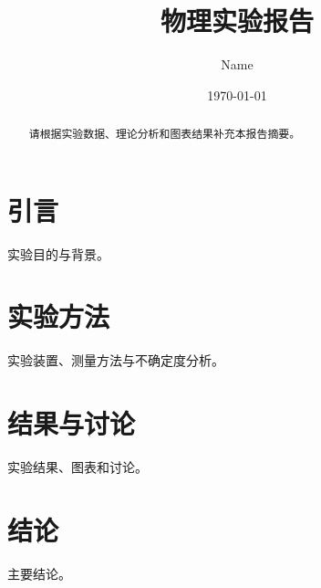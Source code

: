 \documentclass[font=macos]{mpltx}
\begin{document}
\title{物理实验报告}
\author{Name}
\date{\today}
\begin{abstract}
请根据实验数据、理论分析和图表结果补充本报告摘要。
\end{abstract}
\maketitle
\section{引言}
实验目的与背景。
\section{实验方法}
实验装置、测量方法与不确定度分析。
\section{结果与讨论}
实验结果、图表和讨论。
\section{结论}
主要结论。
\end{document}
